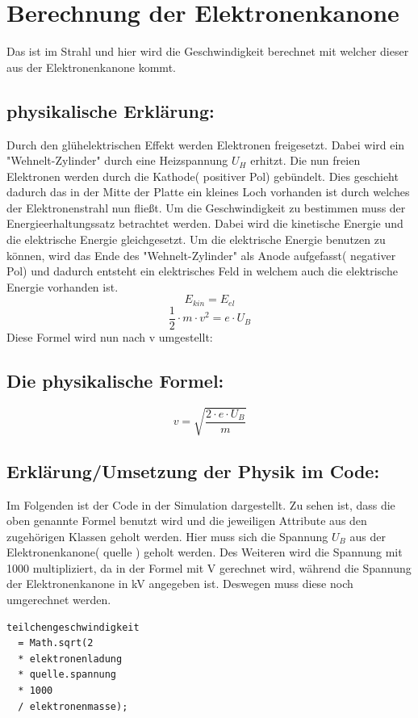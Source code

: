 \section{Berechnung der Elektronenkanone}
Das ist im Strahl und hier wird die Geschwindigkeit berechnet mit welcher dieser aus der Elektronenkanone kommt. 

\subsection{physikalische Erklärung:}

Durch den glühelektrischen Effekt werden Elektronen freigesetzt. Dabei wird ein "Wehnelt-Zylinder" durch eine Heizspannung $U_H$ erhitzt. Die nun freien Elektronen werden durch die Kathode( positiver Pol) gebündelt. Dies geschieht dadurch das in der Mitte der Platte ein kleines Loch vorhanden ist durch welches der Elektronenstrahl nun fließt. Um die Geschwindigkeit zu bestimmen muss der Energieerhaltungssatz betrachtet werden. Dabei wird die kinetische Energie und die elektrische Energie gleichgesetzt. Um die elektrische Energie benutzen zu können, wird das Ende des "Wehnelt-Zylinder" als Anode aufgefasst( negativer Pol) und dadurch entsteht ein elektrisches Feld in welchem auch die elektrische Energie vorhanden ist. 
$$ E_{kin} = E_{el}$$
$$ \frac{1}{2} \cdot m \cdot v^2 = e \cdot U_B$$
Diese Formel wird  nun nach v umgestellt:
\subsection{Die physikalische Formel:} 
$$ v = \sqrt{\frac{2 \cdot e \cdot U_B}{m}}$$

\subsection{Erklärung/Umsetzung der Physik im Code:}

Im Folgenden ist der Code in der Simulation dargestellt. Zu sehen ist, dass die oben genannte Formel benutzt wird und die jeweiligen Attribute aus den zugehörigen Klassen geholt werden. Hier muss sich die Spannung $U_B$ aus der Elektronenkanone( quelle ) geholt werden. Des Weiteren wird die Spannung mit 1000 multipliziert, da in der Formel mit V gerechnet wird, während die Spannung der Elektronenkanone in kV angegeben ist. Deswegen muss diese noch umgerechnet werden.
\begin{lstlisting}
teilchengeschwindigkeit 
  = Math.sqrt(2 
  * elektronenladung 
  * quelle.spannung 
  * 1000 
  / elektronenmasse);
\end{lstlisting}

